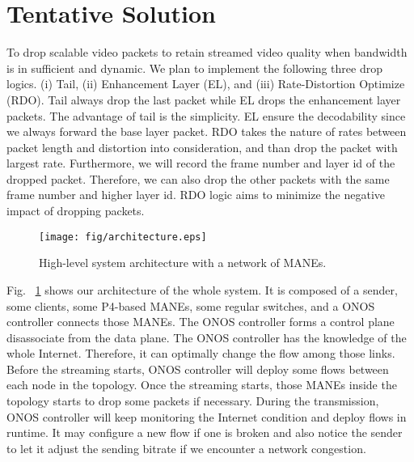 \section{Tentative Solution} \label{sec:Tentive Soution}

To drop scalable video packets to retain streamed video quality when bandwidth is in sufficient and dynamic. We plan to implement the following three drop logics. (i) Tail, (ii) Enhancement Layer (EL), and (iii) Rate-Distortion Optimize (RDO). Tail always drop the last packet while EL drops the enhancement layer packets.  The advantage of tail is the simplicity. EL ensure the decodability since we always forward the base layer packet. RDO takes the nature of rates between packet length and distortion into consideration, and than drop the packet with largest rate. Furthermore, we will record the frame number and layer id of the dropped packet. Therefore, we can also drop the other packets with the same frame number and higher layer id. RDO logic aims to minimize the negative impact of dropping packets. 

\begin{figure}[tbh]
    \centering
    \texttt{[image: fig/architecture.eps]}
    \caption{High-level system architecture with a network of MANEs.}
\vspace{-0.1cm}
    \label{architecture} 
\end{figure}

Fig. ~\ref{architecture} shows our architecture of the whole system. It is composed of a sender, some clients, some P4-based MANEs, some regular switches, and a ONOS controller connects those MANEs. The ONOS controller forms a control plane disassociate from the data plane. The ONOS controller has the knowledge of the whole Internet. Therefore, it can optimally change the flow among those links. Before the streaming starts, ONOS controller will deploy some flows between each node in the topology. Once the streaming starts, those MANEs inside the topology starts to drop some packets if necessary. During the transmission, ONOS controller will keep monitoring the Internet condition and deploy flows in runtime. It may configure a new flow if one is broken and also notice the sender to let it adjust the sending bitrate if we encounter a network congestion. 